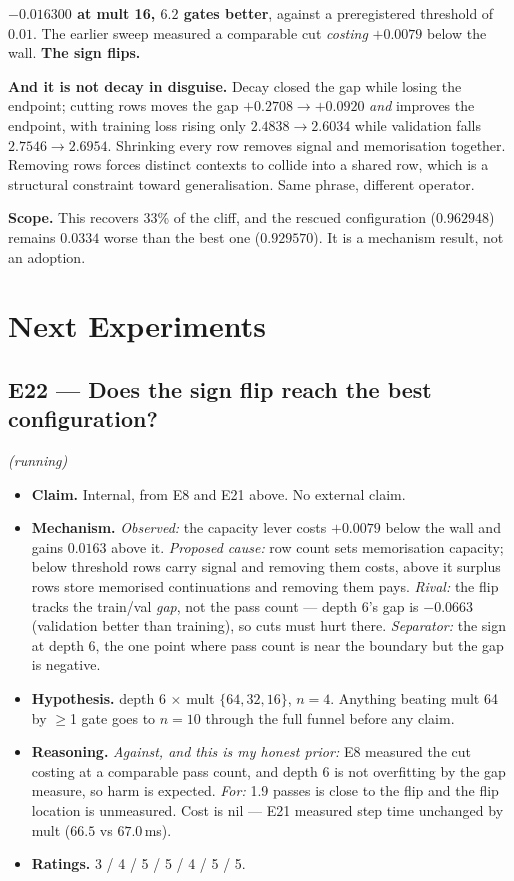 \documentclass{article}
\begin{document}
\textbf{$-0.016300$ at mult 16, $6.2$ gates better}, against a preregistered threshold of $0.01$. The earlier sweep measured a comparable cut \emph{costing} $+0.0079$ below the wall. \textbf{The sign flips.}

\textbf{And it is not decay in disguise.} Decay closed the gap while losing the endpoint; cutting rows moves the gap $+0.2708 \to +0.0920$ \emph{and} improves the endpoint, with training loss rising only $2.4838 \to 2.6034$ while validation falls $2.7546 \to 2.6954$. Shrinking every row removes signal and memorisation together. Removing rows forces distinct contexts to collide into a shared row, which is a structural constraint toward generalisation. Same phrase, different operator.

\textbf{Scope.} This recovers 33\% of the cliff, and the rescued configuration ($0.962948$) remains $0.0334$ worse than the best one ($0.929570$). It is a mechanism result, not an adoption.

\section{Next Experiments}
\subsection{E22 --- Does the sign flip reach the best configuration?} \emph{(running)}
\begin{itemize}\itemsep2pt
\item \textbf{Claim.} Internal, from E8 and E21 above. No external claim.
\item \textbf{Mechanism.} \emph{Observed:} the capacity lever costs $+0.0079$ below the wall and gains $0.0163$ above it. \emph{Proposed cause:} row count sets memorisation capacity; below threshold rows carry signal and removing them costs, above it surplus rows store memorised continuations and removing them pays. \emph{Rival:} the flip tracks the train/val \emph{gap}, not the pass count --- depth 6's gap is $-0.0663$ (validation better than training), so cuts must hurt there. \emph{Separator:} the sign at depth 6, the one point where pass count is near the boundary but the gap is negative.
\item \textbf{Hypothesis.} depth 6 $\times$ mult $\{64,32,16\}$, $n{=}4$. Anything beating mult 64 by $\ge$1 gate goes to $n{=}10$ through the full funnel before any claim.
\item \textbf{Reasoning.} \emph{Against, and this is my honest prior:} E8 measured the cut costing at a comparable pass count, and depth 6 is not overfitting by the gap measure, so harm is expected. \emph{For:} 1.9 passes is close to the flip and the flip location is unmeasured. Cost is nil --- E21 measured step time unchanged by mult ($66.5$ vs $67.0$\,ms).
\item \textbf{Ratings.} 3 / 4 / 5 / 5 / 4 / 5 / 5.
\end{itemize}
\end{document}
